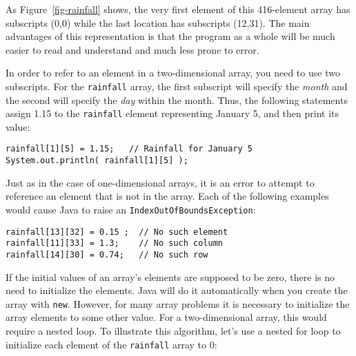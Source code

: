 \begin{figure}[bth]
\end{figure}

As Figure~\ref{fig-rainfall} shows, the very first element of this
416-element array has subscripts (0,0) while the last location has
subscripts (12,31). The main advantages of this representation is that
the program as a whole will be much easier to read and understand and
much less prone to error.


In order to refer to an element in a two-dimensional array, you need
to use two subscripts.  For the {\tt rainfall} array, the first
subscript will specify the {\it month} and the second will specify the
{\it day} within the month.  Thus, the following statements assign 1.15 to
the {\tt rainfall} element representing January 5, and then print its
value:

\begin{jjjlisting}
\begin{lstlisting}
rainfall[1][5] = 1.15;   // Rainfall for January 5
System.out.println( rainfall[1][5] );
\end{lstlisting}
\end{jjjlisting}

Just as in the case of one-dimensional arrays, it is an error to
attempt to reference an element that is not in the array.  Each of the
following examples would cause Java to raise an
{\tt IndexOutOfBoundsException}:

\begin{jjjlisting}
\begin{lstlisting}
rainfall[13][32] = 0.15 ;  // No such element
rainfall[11][33] = 1.3;    // No such column
rainfall[14][30] = 0.74;   // No such row
\end{lstlisting}
\end{jjjlisting}

If the initial values of an array's elements are supposed to be zero,
there is no need to initialize the elements.  Java will do it
automatically when you create the array with {\tt new}. However, for
many array problems it is necessary to initialize the array elements
to some other value.  For a two-dimensional array, this would require a
nested loop.  To illustrate this algorithm, let's use a nested for loop
to initialize each element of the {\tt rainfall} array to 0:


